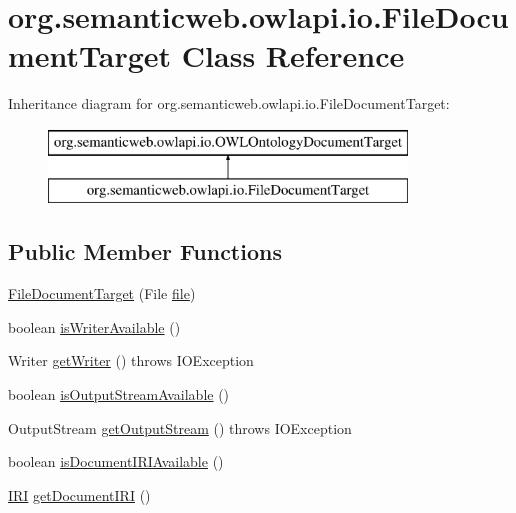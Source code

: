 \hypertarget{classorg_1_1semanticweb_1_1owlapi_1_1io_1_1_file_document_target}{\section{org.\-semanticweb.\-owlapi.\-io.\-File\-Document\-Target Class Reference}
\label{classorg_1_1semanticweb_1_1owlapi_1_1io_1_1_file_document_target}
}
Inheritance diagram for org.\-semanticweb.\-owlapi.\-io.\-File\-Document\-Target\-:\begin{figure}[H]
\begin{center}
\leavevmode
\includegraphics[height=2.000000cm]{classorg_1_1semanticweb_1_1owlapi_1_1io_1_1_file_document_target}
\end{center}
\end{figure}
\subsection*{Public Member Functions}
\begin{DoxyCompactItemize}
\item 
\hyperlink{classorg_1_1semanticweb_1_1owlapi_1_1io_1_1_file_document_target_a8a263ca0b4aa6d90c86c02f730c0d806}{File\-Document\-Target} (File \hyperlink{classorg_1_1semanticweb_1_1owlapi_1_1io_1_1_file_document_target_a6a01e53479ae11e00d8b99edd0e0bbf6}{file})
\item 
boolean \hyperlink{classorg_1_1semanticweb_1_1owlapi_1_1io_1_1_file_document_target_a9068725a1025c4a31a0abc6f8fa4cb2d}{is\-Writer\-Available} ()
\item 
Writer \hyperlink{classorg_1_1semanticweb_1_1owlapi_1_1io_1_1_file_document_target_ab06431a03f2ce4a88b793ad9300337a6}{get\-Writer} ()  throws I\-O\-Exception 
\item 
boolean \hyperlink{classorg_1_1semanticweb_1_1owlapi_1_1io_1_1_file_document_target_ac530625e62fd59bef5bc74991b78dfea}{is\-Output\-Stream\-Available} ()
\item 
Output\-Stream \hyperlink{classorg_1_1semanticweb_1_1owlapi_1_1io_1_1_file_document_target_a4afca0ab16db392e15e808da238b0c55}{get\-Output\-Stream} ()  throws I\-O\-Exception 
\item 
boolean \hyperlink{classorg_1_1semanticweb_1_1owlapi_1_1io_1_1_file_document_target_a33008b654177b9c0fc6fb512d55add10}{is\-Document\-I\-R\-I\-Available} ()
\item 
\hyperlink{classorg_1_1semanticweb_1_1owlapi_1_1model_1_1_i_r_i}{I\-R\-I} \hyperlink{classorg_1_1semanticweb_1_1owlapi_1_1io_1_1_file_document_target_a2d241deafc4c55c72d7114eb2be1e18b}{get\-Document\-I\-R\-I} ()
\end{DoxyCompactItemize}
